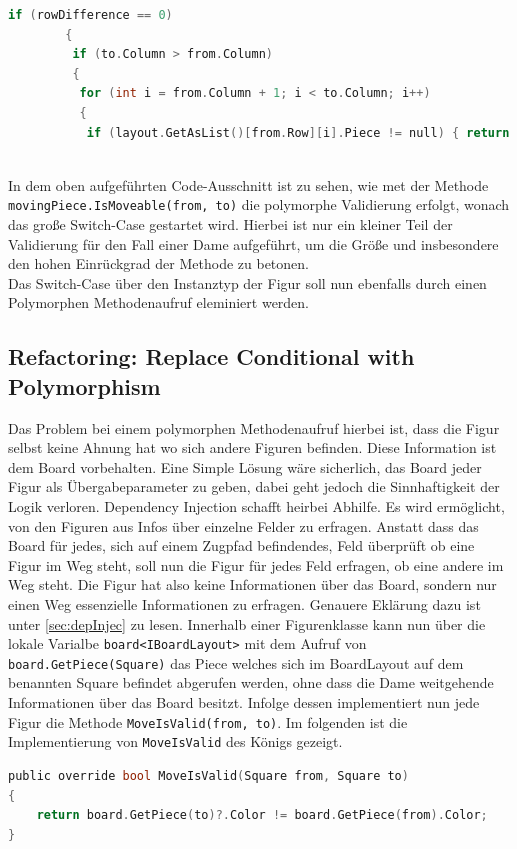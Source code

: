 \documentclass[
10pt, %
a4paper, %
oneside, %
headinclude,footinclude, %
BCOR5mm, %
]{scrartcl}
\begin{document}
\begin{onehalfspace}
\begin{lstlisting}[language=c, style=mStyle]
	    if (rowDifference == 0)
		{
		 if (to.Column > from.Column)
		 {
		  for (int i = from.Column + 1; i < to.Column; i++)
		  {
		   if (layout.GetAsList()[from.Row][i].Piece != null) { return false; }
		  
\end{lstlisting}
In dem oben aufgeführten Code-Ausschnitt ist zu sehen, wie met der Methode \texttt{movingPiece.IsMoveable(from, to)} die polymorphe Validierung erfolgt, wonach das große Switch-Case gestartet wird. Hierbei ist nur ein kleiner Teil der Validierung für den Fall einer Dame aufgeführt, um die Größe  und insbesondere den hohen Einrückgrad der Methode zu betonen. \\
Das Switch-Case über den Instanztyp der Figur soll nun ebenfalls durch einen Polymorphen Methodenaufruf eleminiert werden. 

\subsection{Refactoring: Replace Conditional with Polymorphism}
Das Problem bei einem polymorphen Methodenaufruf hierbei ist, dass die Figur selbst keine Ahnung hat wo sich andere Figuren befinden. Diese Information ist dem Board vorbehalten. Eine Simple Lösung wäre sicherlich, das Board jeder Figur als Übergabeparameter zu geben, dabei geht jedoch die Sinnhaftigkeit der Logik verloren. Dependency Injection schafft heirbei Abhilfe. Es wird ermöglicht, von den Figuren aus Infos über einzelne Felder zu erfragen. Anstatt dass das Board für jedes, sich auf einem Zugpfad befindendes, Feld überprüft ob eine Figur im Weg steht, soll nun die Figur für jedes Feld erfragen, ob eine andere im Weg steht. Die Figur hat also keine Informationen über das Board, sondern nur einen Weg essenzielle Informationen zu erfragen. Genauere Eklärung dazu ist unter \autoref{sec:depInjec} zu lesen. Innerhalb einer Figurenklasse kann nun über die lokale Varialbe \texttt{board<IBoardLayout>} mit dem Aufruf von  \texttt{board.GetPiece(Square)} das Piece welches sich im BoardLayout auf dem benannten Square befindet abgerufen werden, ohne dass die Dame weitgehende Informationen über das Board besitzt.
Infolge dessen implementiert nun jede Figur die Methode \texttt{MoveIsValid(from, to)}. Im folgenden ist die Implementierung von \texttt{MoveIsValid} des Königs gezeigt.

\begin{lstlisting}[language=c, style=mStyle]
public override bool MoveIsValid(Square from, Square to)
{
	return board.GetPiece(to)?.Color != board.GetPiece(from).Color;
}
\end{lstlisting}


\end{onehalfspace}
\end{document}
